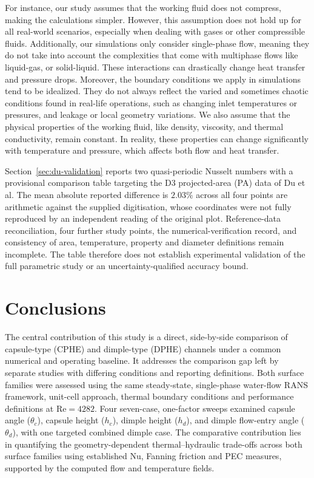\documentclass[energies,article,submit,moreauthors,noheaderline]{Definitions/mdpi}
\begin{document}
For instance, our study assumes that the working fluid does not compress, making the calculations simpler. However, this assumption does not hold up for all real-world scenarios, especially when dealing with gases or other compressible fluids. Additionally, our simulations only consider single-phase flow, meaning they do not take into account the complexities that come with multiphase flows like liquid-gas, or solid-liquid. These interactions can drastically change heat transfer and pressure drops. Moreover, the boundary conditions we apply in simulations tend to be idealized. They do not always reflect the varied and sometimes chaotic conditions found in real-life operations, such as changing inlet temperatures or pressures, and leakage or local geometry variations. We also assume that the physical properties of the working fluid, like density, viscosity, and thermal conductivity, remain constant. In reality, these properties can change significantly with temperature and pressure, which affects both flow and heat transfer.

Section~\ref{sec:du-validation} reports two quasi-periodic Nusselt numbers with a provisional comparison table targeting the D3 projected-area (PA) data of Du et al. The mean absolute reported difference is $2.03\%$ across all four points are arithmetic against the supplied digitisation, whose coordinates were not fully reproduced by an independent reading of the original plot. Reference-data reconciliation, four further study points, the numerical-verification record, and consistency of area, temperature, property and diameter definitions remain incomplete. The table therefore does not establish experimental validation of the full parametric study or an uncertainty-qualified accuracy bound.


\section{Conclusions}
\label{sec:conclusion}

The central contribution of this study is a direct, side-by-side comparison of capsule-type (CPHE) and dimple-type (DPHE) channels under a common numerical and operating baseline. It addresses the comparison gap left by separate studies with differing conditions and reporting definitions. Both surface families were assessed using the same steady-state, single-phase water-flow RANS framework, unit-cell approach, thermal boundary conditions and performance definitions at $\mathrm{Re}=4282$. Four seven-case, one-factor sweeps examined capsule angle ($\theta_c$), capsule height ($h_c$), dimple height ($h_d$), and dimple flow-entry angle ($\theta_d$), with one targeted combined dimple case. The comparative contribution lies in quantifying the geometry-dependent thermal--hydraulic trade-offs across both surface families using established Nu, Fanning friction and PEC measures, supported by the computed flow and temperature fields.
\end{document}
